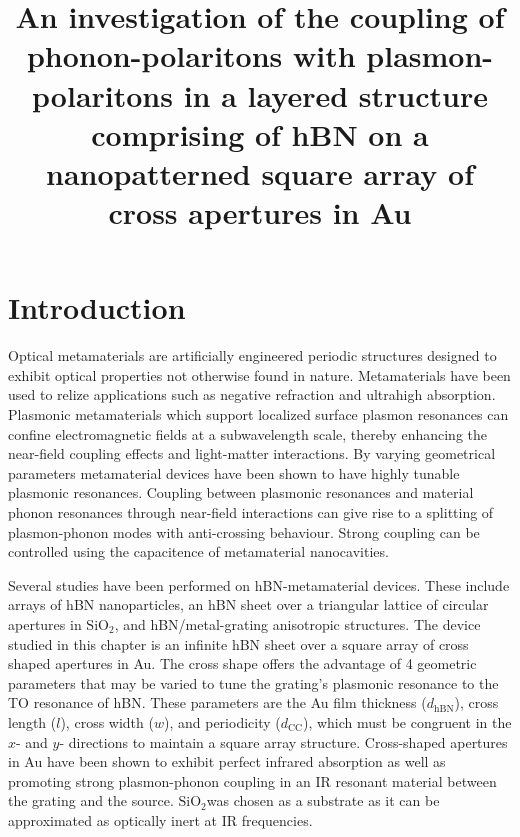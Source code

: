 \documentclass[preprint,
amsmath,amssymb,
aip,
jap,
floatfix,]{revtex4-2}
\begin{document}
	\title{An investigation of the coupling of phonon-polaritons with
	plasmon-polaritons in a layered structure comprising of hBN on a nanopatterned square array of cross apertures in Au}

	\maketitle
	\section{Introduction}
	\label{sec:Intro}
		Optical metamaterials are artificially engineered periodic structures designed to exhibit optical properties not otherwise found in nature. Metamaterials have been used to relize applications such as negative refraction\cite{Shelby:01} and ultrahigh absorption\cite{Yang:21}. Plasmonic metamaterials  which support localized surface plasmon resonances can confine electromagnetic fields at a subwavelength scale, thereby enhancing the near-field coupling effects and light-matter interactions\cite{Cheng:15}. By varying geometrical parameters metamaterial devices have been shown to have highly tunable plasmonic resonances\cite{LiuNL:10}. Coupling between plasmonic resonances and material phonon resonances through near-field interactions can give rise to a splitting of plasmon-phonon modes with anti-crossing behaviour\cite{Shelton:11, Zhang:07}. Strong coupling can be controlled using the capacitence of metamaterial nanocavities\cite{Benz:15}.

		Several studies have been performed on hBN-metamaterial devices. These include arrays of hBN nanoparticles\cite{Caldwell:14}, an hBN sheet over a triangular lattice of circular apertures in $\mathrm{SiO}_{2}$\cite{Yang:20}, and hBN/metal-grating anisotropic structures\cite{Zhao:17}. The device studied in this chapter is an infinite hBN sheet over a square array of cross shaped apertures in Au. The cross shape offers the advantage of 4 geometric parameters that may be varied to tune the grating's plasmonic resonance to the TO resonance of hBN. These parameters are the Au film thickness ($d_\mathrm{hBN}$), cross length ($l$), cross width ($w$), and periodicity ($d_\mathrm{CC}$), which must be congruent in the $x$- and $y$- directions to maintain a square array structure. Cross-shaped apertures in Au have been shown to exhibit perfect infrared absorption\cite{Cheng:14} as well as promoting strong plasmon-phonon coupling in an IR resonant material between the grating and the source\cite{Wan:16}. $\mathrm{SiO}_{2}$was chosen as a substrate as it can be approximated as optically inert at IR frequencies.     
\end{document}
